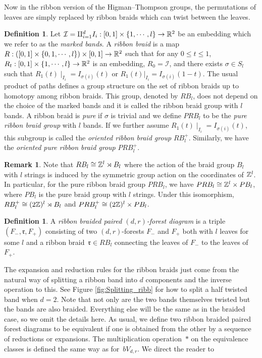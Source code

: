 \documentclass[11pt, a4paper]{amsart}
\theoremstyle{definition}
\newtheorem{rem}[thm]{Remark}
\newtheorem{defn}[thm]{Definition} %
\newcommand{\CI}{{\mathcal {I}}} \newcommand{\CJ}{{\mathcal {J}}}
\begin{document}
Now in the ribbon version of the Higman--Thompson groups, the permutations of leaves are simply
replaced by ribbon braids which can twist between the leaves.


\begin{defn}\label{defn-rb}
Let  $\CI = \amalg_{i=1}^d I_i: [0,1] \times \{1,\cdots,l\} \to \BR^2 $ be an embedding which we refer to as the \emph{marked bands}. A \emph{ribbon braid} is a map  $R: ([0,1] \times \{0,1,\cdots,l\})  \times [0,1] \to  {\mathbb {R}}^2$  such that for any $0\leq t\leq 1$, $R_t: [0,1] \times \{1,\cdots,l\} \to  {\mathbb {R}}^2$ is an embedding,  $R_0 = \CI$, and there exists $\sigma\in S_l$ such that $R_1(t) \mid_{I_i} = I_{\sigma(i)}(t)$ or $R_1(t)|_{I_i} = I_{\sigma(i)}(1-t)$. The usual product of paths defines a group structure on the set of ribbon braids up to homotopy among ribbon braids. This group, denoted by $RB_l$, does not depend on the
choice of the marked bands and it is called the ribbon braid group  with $l$ bands. A ribbon braid is \emph{pure} if $\sigma$ is trivial and we define $PRB_l$ to be the \emph{pure ribbon braid group} with $l$ bands. If we further assume $R_1(t) \mid_{I_i} = I_{\sigma(i)}(t)$, this subgroup is called the \emph{oriented ribbon braid group} $RB_l^+$. Similarly, we have the \emph{oriented pure ribbon braid group} $PRB_l^+$. 
\end{defn}

\begin{rem}
Note that $RB_l \cong {\mathbb {Z}}^l\rtimes B_l$ where the action of the braid group  $B_l$ with $l$ strings is induced by the symmetric group action on the coordinates of ${\mathbb {Z}}^l$. In particular, for the pure ribbon braid group $PRB_l$, we have $PRB_l  \cong {\mathbb {Z}}^l\times PB_l$, where $PB_l$ is the pure braid group with $l$ strings. Under this isomorphism, $RB_l^+ \cong (2{\mathbb {Z}})^l\rtimes B_l$ and $PRB^+_l\cong (2{\mathbb {Z}})^l\times PB_l$.
\end{rem}

\begin{defn}
    A \emph{ribbon braided paired $(d,r)$-forest diagram} is a triple $(F_-,\mathfrak{r},F_+)$
    consisting of two $(d,r)$-forests $F_-$ and $F_+$ both with $l$ leaves for some $l$
     and a ribbon braid~$\mathfrak{r} \in RB_l$ connecting the leaves of $F_-$ to the leaves of $F_+$.
\end{defn}


The expansion and reduction rules for the ribbon braids just come from the natural way of splitting a ribbon band into $d$ components and the inverse operation to this. See Figure \ref{fig:Splitting_ribb} for how to split a half twisted band when $d=2$. Note that not only are the two bands themselves twisted but the bands are also braided.  Everything else will be the same as in the braided case, so we omit the details here.  As usual, we define two ribbon braided paired forest diagrams to be equivalent if one is obtained
from the other by a sequence of reductions or expansions.  The
multiplication operation~$\ast$ on the equivalence classes is defined
the same way as for~$bV_{d,r}$. We direct the reader to \cite[Section 2]{SW21}
\end{document}
